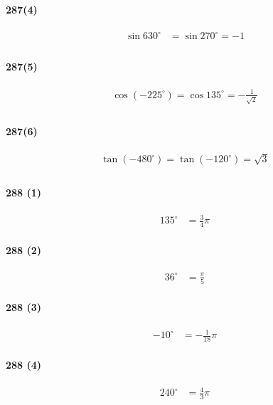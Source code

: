 \documentclass[fleqn,a4j,dvipdfmx,uplatex,twocolumn]{jsarticle}
\begin{document}
\paragraph{287(4)}
\begin{align*}
  \sin 630^{\circ} &= \sin 270^{\circ} = -1 \\
\end{align*}

\paragraph{287(5)}
\begin{align*}
  \cos \left(-225^{\circ}\right)=\cos 135^{\circ}=-\frac{1}{\sqrt{2}} \\
\end{align*}

\paragraph{287(6)}
\begin{align*}
  \tan \left(-480^{\circ}\right)=\tan \left(-120^{\circ}\right)=\sqrt{3} \\
\end{align*}

\paragraph{288 (1)}
\begin{align*}
  135^{\circ} &= \frac{3}{4} \pi
\end{align*}

\paragraph{288 (2)}
\begin{align*}
  36^{\circ} &= \frac{\pi}{5}
\end{align*}

\paragraph{288 (3)}
\begin{align*}
  -10^{\circ} &= -\frac{1}{18} \pi
\end{align*}

\paragraph{288 (4)}
\begin{align*}
  240^{\circ} &= \frac{4}{3} \pi
\end{align*}
\end{document}
